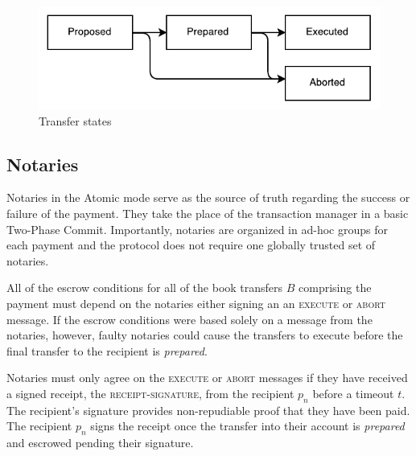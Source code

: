 \documentclass[letterpaper,twocolumn,10pt]{article}
\begin{document}
\begin{figure}[ht]
    \centering
    \includegraphics[width=\columnwidth]{figures/transfer-states.pdf}
    \caption{Transfer states}
    \label{fig:transfer-states}
\end{figure}


\subsection{Notaries}


Notaries in the Atomic mode serve as the source of truth regarding the success or failure of the payment. They take the place of the transaction manager in a basic Two-Phase Commit. Importantly, notaries are organized in ad-hoc groups for each payment and the protocol does not require one globally trusted set of notaries.

All of the escrow conditions for all of the book transfers $B$ comprising the payment must depend on the notaries either signing an an \textsc{execute} or \textsc{abort} message. If the escrow conditions were based solely on a message from the notaries, however, faulty notaries could cause the transfers to execute before the final transfer to the recipient is \textit{prepared}. \cite{dolev1983authenticated}

Notaries must only agree on the \textsc{execute} or \textsc{abort} messages if they have received a signed receipt, the \textsc{receipt-signature}, from the recipient $p_n$ before a timeout $t$. The recipient's signature provides non-repudiable proof that they have been paid. The recipient $p_n$ signs the receipt once the transfer into their account is \textit{prepared} and escrowed pending their signature.

\end{document}
